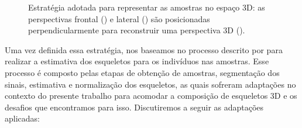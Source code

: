\begin{figure}[ht!]
    \centering
    \caption{\textmd{Estratégia adotada para representar as amostras no espaço 3D: as perspectivas frontal () e lateral () são posicionadas perpendicularmente para reconstruir uma perspectiva 3D ().}}
    \nomefonte{}
    \label{fig:our-strategy-3d}
\end{figure}


Uma vez definida essa estratégia, nos baseamos no processo descrito por  para realizar a estimativa dos esqueletos para os indivíduos nas amostras. Esse processo é composto pelas etapas de obtenção de amostras, segmentação dos sinais, estimativa e normalização dos esqueletos, as quais sofreram adaptações no contexto do presente trabalho para acomodar a composição de esqueletos 3D e os desafios que encontramos para isso. Discutiremos a seguir as adaptações aplicadas:

